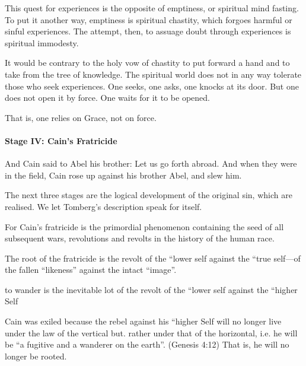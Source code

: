 This quest for experiences is the opposite of emptiness, or spiritual mind fasting. To put it another way, emptiness is
spiritual chastity, which forgoes harmful or sinful experiences. The attempt, then, to assuage doubt through
experiences is spiritual immodesty.

\begin{quotex}
It would be contrary to the holy vow of chastity to put forward a hand and to take from the tree of knowledge. The
spiritual world does not in any way tolerate those who seek experiences. One seeks, one asks, one knocks at its door.
But one does not open it by force. One waits for it to be opened. 

\end{quotex}
That is, one relies on Grace, not on force.

\paragraph{Stage IV: Cain's Fratricide}
\begin{quotex}
And Cain said to Abel his brother: Let us go forth abroad. And when they were in the field, Cain rose up against his
brother Abel, and slew him. 
\end{quotex}

The next three stages are the logical development of the original sin, which are realised. We let Tomberg's
description speak for itself.

\begin{quotex}
For Cain's fratricide is the primordial phenomenon containing the seed of all subsequent wars, revolutions
and revolts in the history of the human race.

The root of the fratricide is the revolt of the “lower self against the “true self—of the fallen “likeness”
against the intact “image”.

to wander is the inevitable lot of the revolt of the “lower self against the “higher Self 

\end{quotex}
Cain was exiled because the rebel against his “higher Self will no longer live under the law of the vertical but. rather
under that of the horizontal, i.e. he will be “a fugitive and a wanderer on the earth”. (Genesis 4:12) That is, he will
no longer be rooted.

